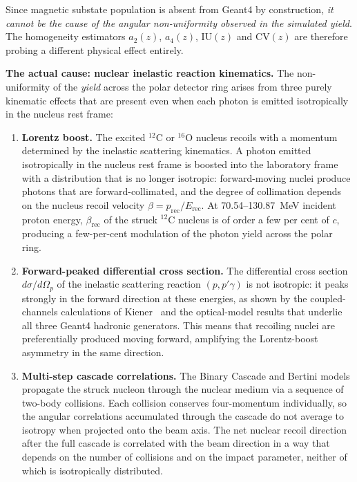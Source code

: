 \documentclass[a4paper]{article}
\begin{document}
Since magnetic substate population is absent from Geant4 by construction, \emph{it cannot be the cause of the angular non-uniformity observed in the simulated yield}. The homogeneity estimators $a_2(z)$, $a_4(z)$, $\mathrm{IU}(z)$ and $\mathrm{CV}(z)$ are therefore probing a different physical effect entirely.

\textbf{The actual cause: nuclear inelastic reaction kinematics.}
The non-uniformity of the \emph{yield} across the polar detector ring arises from three purely kinematic effects that are present even when each photon is emitted isotropically in the nucleus rest frame:

\begin{enumerate}
    \item \textbf{Lorentz boost.} The excited $^{12}$C or $^{16}$O nucleus recoils with a momentum determined by the inelastic scattering kinematics. A photon emitted isotropically in the nucleus rest frame is boosted into the laboratory frame with a distribution that is no longer isotropic: forward-moving nuclei produce photons that are forward-collimated, and the degree of collimation depends on the nucleus recoil velocity $\beta = p_\mathrm{rec}/E_\mathrm{rec}$. At 70.54--130.87~MeV incident proton energy, $\beta_\mathrm{rec}$ of the struck $^{12}$C nucleus is of order a few per cent of $c$, producing a few-per-cent modulation of the photon yield across the polar ring.
    \item \textbf{Forward-peaked differential cross section.} The differential cross section $d\sigma/d\Omega_p$ of the inelastic scattering reaction $(p,p'\gamma)$ is not isotropic: it peaks strongly in the forward direction at these energies, as shown by the coupled-channels calculations of Kiener~\cite{kiener1998} and the optical-model results that underlie all three Geant4 hadronic generators. This means that recoiling nuclei are preferentially produced moving forward, amplifying the Lorentz-boost asymmetry in the same direction.
    \item \textbf{Multi-step cascade correlations.} The Binary Cascade and Bertini models propagate the struck nucleon through the nuclear medium via a sequence of two-body collisions. Each collision conserves four-momentum individually, so the angular correlations accumulated through the cascade do not average to isotropy when projected onto the beam axis. The net nuclear recoil direction after the full cascade is correlated with the beam direction in a way that depends on the number of collisions and on the impact parameter, neither of which is isotropically distributed.
\end{enumerate}
\end{document}
